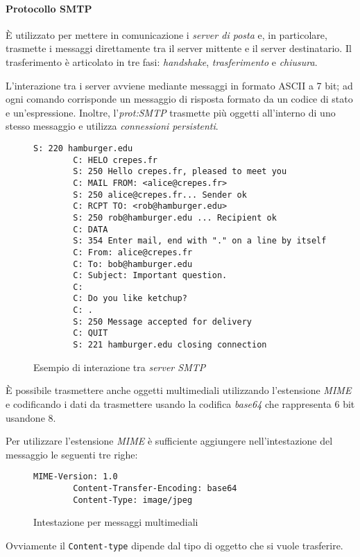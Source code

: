 \paragraph{Protocollo SMTP}
È utilizzato per mettere in comunicazione i \emph{server di posta} e, in particolare,
trasmette i messaggi direttamente tra il server mittente e il server destinatario.
Il trasferimento è articolato in tre fasi: \emph{handshake}, \emph{trasferimento}
e \emph{chiusura}.

L'interazione tra i server avviene mediante messaggi in formato ASCII a 7 bit; ad
ogni comando corrisponde un messaggio di risposta formato da un codice di stato e
un'espressione. Inoltre, l'\emph{\gls{prot:SMTP}} trasmette più oggetti all'interno
di uno stesso messaggio e utilizza \emph{connessioni persistenti}.

\begin{figure}[h!]
    \centering
    \begin{lstlisting}[basicstyle=\scriptsize]
        S: 220 hamburger.edu
        C: HELO crepes.fr
        S: 250 Hello crepes.fr, pleased to meet you
        C: MAIL FROM: <alice@crepes.fr>
        S: 250 alice@crepes.fr... Sender ok
        C: RCPT TO: <rob@hamburger.edu>
        S: 250 rob@hamburger.edu ... Recipient ok
        C: DATA
        S: 354 Enter mail, end with "." on a line by itself
        C: From: alice@crepes.fr
        C: To: bob@hamburger.edu
        C: Subject: Important question.
        C: 
        C: Do you like ketchup?
        C: .
        S: 250 Message accepted for delivery
        C: QUIT
        S: 221 hamburger.edu closing connection
    \end{lstlisting}
    \caption{Esempio di interazione tra \emph{server SMTP}}
\end{figure}\noindent
È possibile trasmettere anche oggetti multimediali utilizzando l'estensione
\emph{MIME} e codificando i dati da trasmettere usando la codifica \emph{base64}
che rappresenta 6 bit usandone 8.

Per utilizzare l'estensione \emph{MIME} è sufficiente aggiungere nell'intestazione
del messaggio le seguenti tre righe:
\newpage
\begin{figure}[ht]
    \centering
    \begin{lstlisting}[basicstyle=\scriptsize]
        MIME-Version: 1.0
        Content-Transfer-Encoding: base64
        Content-Type: image/jpeg
    \end{lstlisting}
    \caption{Intestazione per messaggi multimediali}
\end{figure}\noindent
Ovviamente il \texttt{Content-type} dipende dal tipo di oggetto che si vuole
trasferire.

